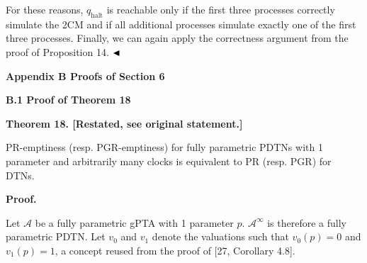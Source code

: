 \documentclass[10pt,a4paper]{article}
\begin{document}
For these reasons, $q_{\textrm{halt}}$ is reachable only if the first three processes correctly simulate the 2CM and if all additional processes simulate exactly one of the first three processes. Finally, we can again apply the correctness argument from the proof of Proposition 14. $\hfill\blacktriangleleft$\par
 
 
 
 


 
\par\medskip\noindent\textbf{Appendix B Proofs of Section 6}\par
 
 
\par\medskip\noindent\textbf{B.1 Proof of Theorem 18}\par
 
 
 
\par\medskip\noindent\textbf{Theorem 18. [Restated, see original statement.]}\par
 
 
PR-emptiness (resp. PGR-emptiness) for fully parametric PDTNs with 1 parameter and arbitrarily many clocks is equivalent to PR (resp. PGR) for DTNs.\par
 
 
 
 
 
\par\medskip\noindent\textbf{Proof.}\par
 
 
Let $\mathcal{A}$ be a fully parametric gPTA with 1 parameter $p$. ${\mathcal{A}}^{\infty}$ is therefore a fully parametric PDTN. Let $v_{0}$ and $v_{1}$ denote the valuations such that $v_{0}(p)=0$ and $v_{1}(p)=1$, a concept reused from the proof of [27, Corollary 4.8].\par
 
 
\end{document}
